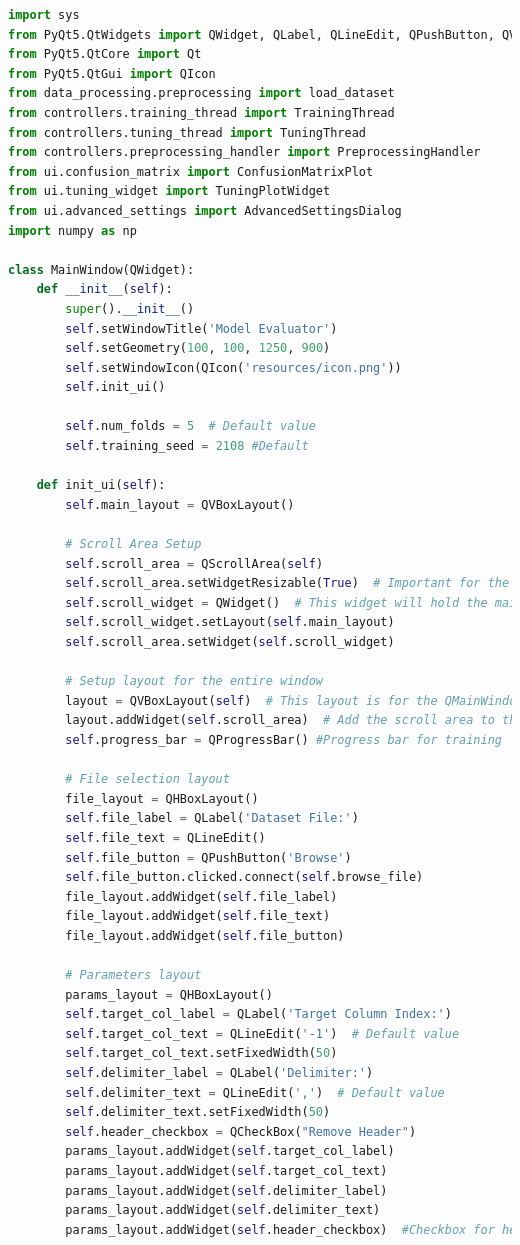 \documentclass[letterpaper,10pt]{article}
\begin{document}
\begin{lstlisting}[language=Python, caption=ui.py - Final structure after refactoring. ]
    import sys
from PyQt5.QtWidgets import QWidget, QLabel, QLineEdit, QPushButton, QVBoxLayout, QHBoxLayout, QFileDialog, QMessageBox, QCheckBox, QScrollArea,QProgressBar, QDialog
from PyQt5.QtCore import Qt
from PyQt5.QtGui import QIcon
from data_processing.preprocessing import load_dataset
from controllers.training_thread import TrainingThread
from controllers.tuning_thread import TuningThread
from controllers.preprocessing_handler import PreprocessingHandler
from ui.confusion_matrix import ConfusionMatrixPlot
from ui.tuning_widget import TuningPlotWidget
from ui.advanced_settings import AdvancedSettingsDialog
import numpy as np

class MainWindow(QWidget):
    def __init__(self):
        super().__init__()
        self.setWindowTitle('Model Evaluator')
        self.setGeometry(100, 100, 1250, 900) 
        self.setWindowIcon(QIcon('resources/icon.png'))
        self.init_ui()

        self.num_folds = 5  # Default value
        self.training_seed = 2108 #Default
        
    def init_ui(self):
        self.main_layout = QVBoxLayout()

        # Scroll Area Setup
        self.scroll_area = QScrollArea(self)
        self.scroll_area.setWidgetResizable(True)  # Important for the scroll area to adapt
        self.scroll_widget = QWidget()  # This widget will hold the main layout
        self.scroll_widget.setLayout(self.main_layout)
        self.scroll_area.setWidget(self.scroll_widget)

        # Setup layout for the entire window
        layout = QVBoxLayout(self)  # This layout is for the QMainWindow itself
        layout.addWidget(self.scroll_area)  # Add the scroll area to the main window layout
        self.progress_bar = QProgressBar() #Progress bar for training

        # File selection layout
        file_layout = QHBoxLayout()
        self.file_label = QLabel('Dataset File:')
        self.file_text = QLineEdit()
        self.file_button = QPushButton('Browse')
        self.file_button.clicked.connect(self.browse_file)
        file_layout.addWidget(self.file_label)
        file_layout.addWidget(self.file_text)
        file_layout.addWidget(self.file_button)

        # Parameters layout
        params_layout = QHBoxLayout()
        self.target_col_label = QLabel('Target Column Index:')
        self.target_col_text = QLineEdit('-1')  # Default value
        self.target_col_text.setFixedWidth(50)  
        self.delimiter_label = QLabel('Delimiter:') 
        self.delimiter_text = QLineEdit(',')  # Default value
        self.delimiter_text.setFixedWidth(50) 
        self.header_checkbox = QCheckBox("Remove Header")
        params_layout.addWidget(self.target_col_label)
        params_layout.addWidget(self.target_col_text)
        params_layout.addWidget(self.delimiter_label)
        params_layout.addWidget(self.delimiter_text)
        params_layout.addWidget(self.header_checkbox)  #Checkbox for header removal


\end{lstlisting}
\end{document}
